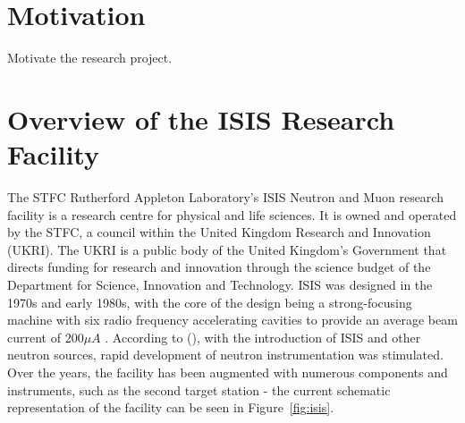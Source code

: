 \documentclass[10pt,oneside]{report}
\begin{document}
\textbf{ }


\section{Motivation}
Motivate the research project.




\section{Overview of the ISIS Research Facility}\label{sec:isisbg}

The STFC Rutherford Appleton Laboratory's ISIS Neutron and Muon research facility is a research centre for physical and life sciences. It is owned and operated by the STFC, a council within the United Kingdom Research and Innovation (UKRI). The UKRI is a public body of the United Kingdom's Government that directs funding for research and innovation through the science budget of the Department for Science, Innovation and Technology. ISIS was designed in the 1970s and early 1980s, with the core of the design being a strong-focusing machine with six radio frequency accelerating cavities to provide an average beam current of $200\mu A$ \cite{thomason2019isis}. According to (\citet{thomason2019isis}), with the introduction of ISIS and other neutron sources, rapid development of neutron instrumentation was stimulated. Over the years, the facility has been augmented with numerous components and instruments, such as the second target station - the current schematic representation of the facility can be seen in Figure~\ref{fig:isis}.
\end{document}
